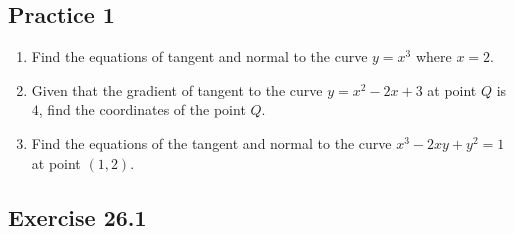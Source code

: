 \documentclass{report}
\begin{document}
\subsection{Practice 1}
\begin{enumerate}
    \item Find the equations of tangent and normal to the curve $y = x^3$ where $x = 2$.
    \item Given that the gradient of tangent to the curve $y = x^2 - 2x + 3$ at point $Q$
          is $4$, find the coordinates of the point $Q$.
    \item Find the equations of the tangent and normal to the curve $x^3 - 2xy + y^2 = 1$
          at point $(1, 2)$.
\end{enumerate}

\subsection{Exercise 26.1}
\end{document}
